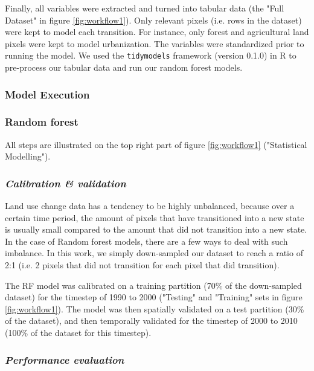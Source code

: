Finally, all variables were extracted and turned into tabular data (the "Full Dataset" in figure \ref{fig:workflow1}). Only relevant pixels (i.e. rows in the dataset) were kept to model each transition. For instance, only forest and agricultural land pixels were kept to model urbanization. The variables were standardized prior to running the model. We used the \verb|tidymodels| framework (version 0.1.0) in R to pre-process our tabular data and run our random forest models. \\

\subsubsection{Model Execution}

\subsubsection*{Random forest}

All steps are illustrated on the top right part of figure \ref{fig:workflow1} ("Statistical Modelling").

\subsubsection*{\textit{Calibration \& validation}}

Land use change data has a tendency to be highly unbalanced, because over a certain time period, the amount of pixels that have transitioned into a new state is usually small compared to the amount that did not transition into a new state. In the case of Random forest models, there are a few ways to deal with such imbalance. In this work, we simply down-sampled our dataset to reach a ratio of 2:1 (i.e. 2 pixels that did not transition for each pixel that did transition).

The RF model was calibrated on a training partition (70\% of the down-sampled dataset) for the timestep of 1990 to 2000 ("Testing" and "Training" sets in figure \ref{fig:workflow1}). The model was then spatially validated on a test partition (30\% of the dataset), and then temporally validated for the timestep of 2000 to 2010 (100\% of the dataset for this timestep). \\

\subsubsection*{\textit{Performance evaluation}}

